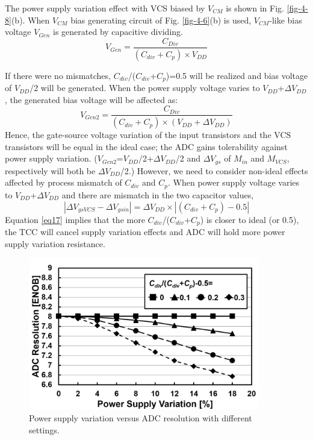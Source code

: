 The power supply variation effect with VCS biased by $V_{CM}$ is shown in Fig. \ref{fig-4-8}(b). When $V_{CM}$ bias generating circuit of Fig. \ref{fig-4-6}(b) is used, $V_{CM}$-like bias voltage $V_{Gen}$ is generated by capacitive dividing.
\begin{equation}
    V_{Gen} = \frac{C_{Div}}{(C_{div}+C_p) \times V_{DD}}
\end{equation}

If there were no mismatches, $C_{div}$/($C_{div}$+$C_p$)=0.5 will be realized and bias voltage of $V_{DD}$/2 will be generated. When the power supply voltage varies to $V_{DD}$+$\Delta V_{DD}$, the generated bias voltage will be affected as:
\begin{equation}
    V_{Gen2} = \frac{C_{Div}}{(C_{div}+C_p) \times (V_{DD}+\Delta V_{DD})}
\end{equation}
Hence, the gate-source voltage variation of the input transistors and the VCS transistors will be equal in the ideal case; the ADC gains tolerability against power supply variation. ($V_{Gen2}$=$V_{DD}$/2+$\Delta V_{DD}$/2 and $\Delta V_{gs}$ of $M_{in}$ and $M_{VCS}$, respectively will both be $\Delta V_{DD}$/2.)  
However, we need to consider non-ideal effects affected by process mismatch of $C_{div}$ and $C_p$. When power supply voltage varies to $V_{DD}$+$\Delta V_{DD}$ and there are mismatch in the two capacitor values, 
\begin{equation}
    | \Delta V_{gsVCS} - \Delta V_{gsin} | = \Delta V_{DD} \times |(C_{div}+C_p) - 0.5 |
    \label{eq17}
\end{equation}
Equation \eqref{eq17} implies that the more $C_{div}$/($C_{div}$+$C_p$) is closer to ideal (or 0.5), the TCC will cancel supply variation effects and ADC will hold more power supply variation resistance. 

\begin{figure}
\centering
  \includegraphics[width=0.9\textwidth]{figure/chap4/fig9.jpg}
  \caption{Power supply variation versus ADC resolution with different settings.}
  \label{fig-4-9}
\end{figure}

